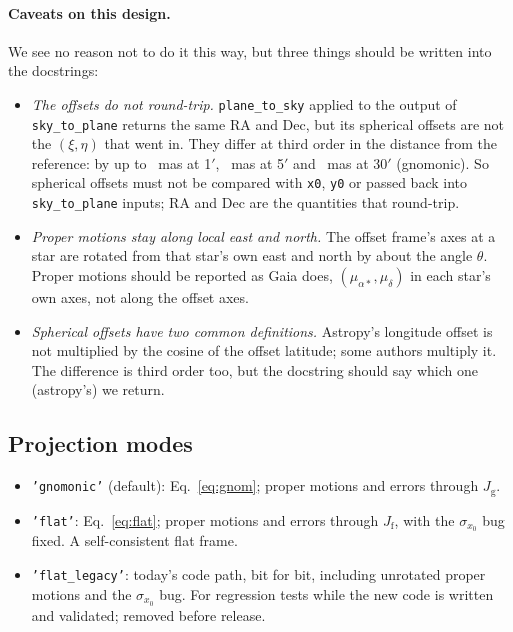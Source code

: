 \documentclass[11pt]{article}
\newcommand{\code}[1]{\texttt{#1}}
\begin{document}
\paragraph{Caveats on this design.} We see no reason not to do it this way,
but three things should be written into the docstrings:
\begin{itemize}
  \item \emph{The offsets do not round-trip.} \code{plane\_to\_sky} applied
    to the output of \code{sky\_to\_plane} returns the same RA and Dec, but
    its spherical offsets are not the $(\xi,\eta)$ that went in. They differ
    at third order in the distance from the reference: by up to
    \SphOffOne~mas at 1$'$, \SphOffFive~mas at 5$'$ and \SphOffThirty~mas at
    30$'$ (gnomonic). So spherical offsets must not be compared with \code{x0},
    \code{y0} or passed back into \code{sky\_to\_plane} inputs; RA and Dec are
    the quantities that round-trip.
  \item \emph{Proper motions stay along local east and north.} The offset
    frame's axes at a star are rotated from that star's own east and north by
    about the angle $\theta$. Proper motions should be reported as Gaia does,
    $(\mu_{\alpha*},\mu_\delta)$ in each star's own axes, not along the offset
    axes.
  \item \emph{Spherical offsets have two common definitions.} Astropy's
    longitude offset is not multiplied by the cosine of the offset latitude;
    some authors multiply it. The difference is third order too, but the
    docstring should say which one (astropy's) we return.
\end{itemize}

\subsection{Projection modes}

\begin{itemize}
  \item \code{'gnomonic'} (default): Eq.~\eqref{eq:gnom}; proper motions
    and errors through $J_\mathrm{g}$.
  \item \code{'flat'}: Eq.~\eqref{eq:flat}; proper motions and errors
    through $J_\mathrm{f}$, with the $\sigma_{x_0}$ bug fixed. A
    self-consistent flat frame.
  \item \code{'flat\_legacy'}: today's code path, bit for bit, including
    unrotated proper motions and the $\sigma_{x_0}$ bug. For regression tests
    while the new code is written and validated; removed before release.
\end{itemize}
\end{document}
